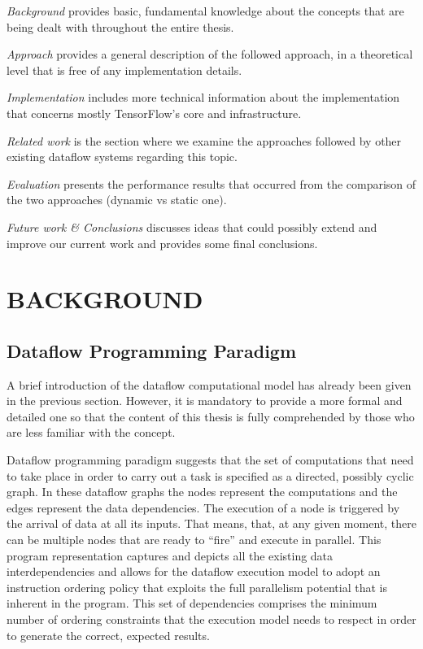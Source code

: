 \documentclass[ack,preface]{dithesis}
\begin{document}
\textit{Background} provides basic, fundamental knowledge about the concepts that are being dealt with throughout the entire thesis.

\textit{Approach} provides a general description of the followed approach, in a theoretical  level that is free of any implementation details.

\textit{Implementation} includes more technical information about the implementation that concerns mostly TensorFlow's core and infrastructure.

\textit{Related work} is the section where we examine the approaches followed by other existing dataflow systems regarding this topic.

\textit{Evaluation} presents the performance results that occurred from the comparison of the two approaches (dynamic vs static one).

\textit{Future work \& Conclusions} discusses ideas that could possibly extend and improve our current work and provides some final conclusions.



\chapter{BACKGROUND}
    \section{Dataflow Programming Paradigm}
A brief introduction of the dataflow computational model has already been given in the previous section. However, it is mandatory to provide a more formal and detailed one so that the content of this thesis is fully comprehended by those who are less familiar with the concept.

Dataflow programming paradigm suggests that the set of computations that need to take place in order to carry out a task is specified as a directed, possibly cyclic graph. In these dataflow graphs the nodes represent the computations and the edges represent the data dependencies. The execution of a node is triggered by the arrival of data at all its inputs. That means, that, at any given moment, there can be multiple nodes that are ready to “fire” and execute in parallel. This program representation captures and depicts all the existing data interdependencies and allows for the dataflow execution model to adopt an instruction ordering policy that exploits the full parallelism potential that is inherent in the program. This set of dependencies comprises the minimum number of ordering constraints that the execution model needs to respect in order to generate the correct, expected results.
\end{document}
